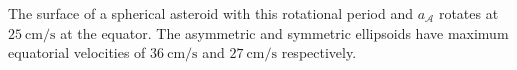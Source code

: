 The surface of a spherical asteroid with this rotational period and $a_\mathcal{A}$ rotates at $\SI{25}{\centi\meter\per\second}$ at the equator. The asymmetric and symmetric ellipsoids have maximum equatorial velocities of $\SI{36}{\centi\meter\per\second}$ and $\SI{27}{\centi\meter\per\second}$ respectively.







